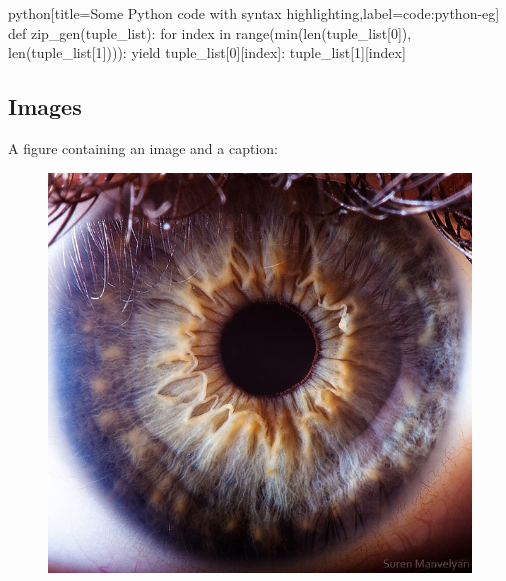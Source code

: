 \begin{code}[firstnumber=11]{python}[title={Some Python code with syntax highlighting},label=code:python-eg]
def zip_gen(tuple_list):
    for index in range(min(len(tuple_list[0]), len(tuple_list[1]))):
        yield {tuple_list[0][index]: tuple_list[1][index]}
\end{code}

\subsection{Images}

A figure containing an image and a caption:
\begin{figure}[H]
	\includegraphics[width=0.8\linewidth]{eye.png}
	\label{fig:human-eye}
\end{figure}

